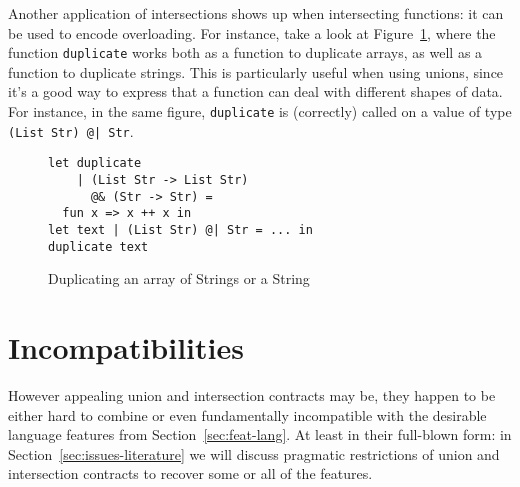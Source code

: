 \documentclass[sigplan,screen,10pt]{acmart}
\newcommand{\unsure}[2][1=]{}
\newcommand{\nickel}[1]{\lstinline[language=nickel]{#1}}
\begin{document}
\unsure{Maybe it's better to give it in Typescript syntax?
left it commented just in case}



Another application of intersections shows up when intersecting
functions: it can be used to encode overloading.
For instance, take a look at Figure~\ref{fig:intersection-overloading-ex}, where the function
\nickel{duplicate} works both as a function to duplicate
arrays, as well as a function to duplicate strings.
This is particularly useful when using unions, since it's a
good way to express that a function can deal with different
shapes of data.
For instance, in the same figure, \nickel{duplicate} is (correctly) called
on a value of type \nickel{(List Str) @| Str}.

\begin{figure}[h]
\begin{lstlisting}[language=nickel]
let duplicate
    | (List Str -> List Str)
      @& (Str -> Str) =
  fun x => x ++ x in
let text | (List Str) @| Str = ... in
duplicate text
\end{lstlisting}
\caption{Duplicating an array of Strings or a String}
\label{fig:intersection-overloading-ex}
\end{figure}

\section{Incompatibilities}
\label{sec:issues-sem}

However appealing union and intersection contracts may be, they happen to be
either hard to combine or even fundamentally incompatible with the desirable
language features from Section~\ref{sec:feat-lang}. At least in their full-blown
form: in Section~\ref{sec:issues-literature} we will discuss pragmatic
restrictions of union and intersection contracts to recover some or all of the
features.
\end{document}
